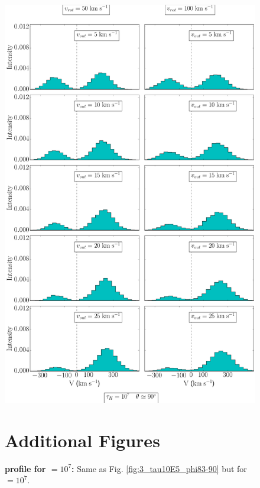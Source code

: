 \documentclass[twocolappendix]{latex/emulateapj}
\begin{document}
\begin{figure}[!htbp]
	\centering
	\begin{minipage}[b]{0.45\textwidth}
		\vspace{3mm}
		\includegraphics[width=\textwidth]{./figures/3_tau10E7_phi83-90}
		\caption{\textbf{\lya profile for \tauh$=10^7$:} Same as Fig. \ref{fig:3_tau10E5_phi83-90} but for \tauh$=10^7$.
			\label{fig:3_tau10E7_phi83-90}}
	\end{minipage}
	\hfill
	\begin{minipage}[b]{0.45\textwidth}
		\section{Additional Figures}
		\label{ap:additional_figures}
		

\end{minipage}
\end{figure}
\end{document}
